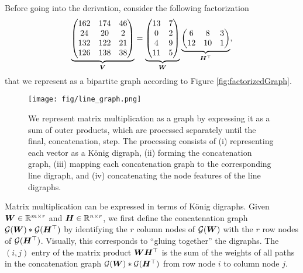 \documentclass{article}
\begin{document}
Before going into the derivation, consider the following factorization%
\begin{equation}
\underbrace{
    \begin{pmatrix}
        162 & 174 & 46 \\
        24 & 20 & 2 \\
        132 & 122 & 21 \\
        126 & 138 &38
    \end{pmatrix}
    }_{\bm{V}}
    =
    \underbrace{
    \begin{pmatrix}
        13 & 7 \\
        0 & 2 \\
        4 & 9 \\
        11 & 5
    \end{pmatrix}
    }_{\bm{W}}
    \underbrace{
    \begin{pmatrix}
        6 & 8 & 3\\
        12 & 10 & 1
    \end{pmatrix}
    }_{{\bm{H}}^\top  },
\end{equation}
that we represent as a bipartite graph according to Figure \ref{fig:factorizedGraph}.

\begin{figure*}
    \centering
    \texttt{[image: fig/line\_graph.png]}
    \caption{We represent matrix multiplication as a graph by expressing it as a sum of outer products, which are processed separately until the final, concatenation, step. The processing consists of (i) representing each vector as a König digraph, (ii) forming the concatenation graph, (iii) mapping each concatenation graph to the corresponding line digraph, and (iv) concatenating the node features of the line digraphs.}
    \label{fig:derivation_graph_representation}
\end{figure*}
Matrix multiplication can be expressed in terms of König digraphs. Given ${\bm{W}}\in\mathbb{R}^{m\times r}$ and ${\bm{H}}\in\mathbb{R}^{n\times r}$, we first define the concatenation graph ${\mathcal{G}}({\bm{W}})*{\mathcal{G}}({\bm{H}}^\top  )$ by identifying the $r$ column nodes of ${\mathcal{G}}({\bm{W}})$ with the $r$ row nodes of ${\mathcal{G}}({\bm{H}}^\top  )$. Visually, this corresponds to ``gluing together'' the digraphs. The $(i,j)$ entry of the matrix product ${\bm{W}}{\bm{H}}^\top  $ is the sum of the weights of all paths in the concatenation graph ${\mathcal{G}}({\bm{W}})*{\mathcal{G}}({\bm{H}}^\top  )$ from row node $i$ to column node $j$. 
\end{document}
